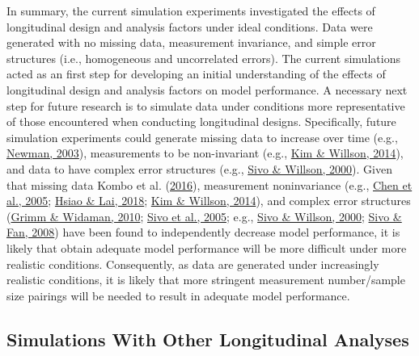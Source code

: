 \documentclass[
12pt, %
twoside,
english]{guelphthesis}
\begin{document}
In summary, the current simulation experiments investigated the effects of longitudinal design and analysis factors under ideal conditions. Data were generated with no missing data, measurement invariance, and simple error structures (i.e., homogeneous and uncorrelated errors). The current simulations acted as an first step for developing an initial understanding of the effects of longitudinal design and analysis factors on model performance. A necessary next step for future research is to simulate data under conditions more representative of those encountered when conducting longitudinal designs. Specifically, future simulation experiments could generate missing data to increase over time (e.g., \protect\hyperlink{ref-newman2003}{Newman, 2003}), measurements to be non-invariant (e.g., \protect\hyperlink{ref-kim2014a}{Kim \& Willson, 2014}), and data to have complex error structures (e.g., \protect\hyperlink{ref-sivo2000}{Sivo \& Willson, 2000}). Given that missing data Kombo et al. (\protect\hyperlink{ref-kombo2016}{2016}), measurement noninvariance (e.g., \protect\hyperlink{ref-chen2005}{Chen et al., 2005}; \protect\hyperlink{ref-hsiao2018}{Hsiao \& Lai, 2018}; \protect\hyperlink{ref-kim2014a}{Kim \& Willson, 2014}), and complex error structures (\protect\hyperlink{ref-grimm2010a}{Grimm \& Widaman, 2010}; \protect\hyperlink{ref-sivo2005}{Sivo et al., 2005}; e.g., \protect\hyperlink{ref-sivo2000}{Sivo \& Willson, 2000}; \protect\hyperlink{ref-sivo2008}{Sivo \& Fan, 2008}) have been found to independently decrease model performance, it is likely that obtain adequate model performance will be more difficult under more realistic conditions. Consequently, as data are generated under increasingly realistic conditions, it is likely that more stringent measurement number/sample size pairings will be needed to result in adequate model performance.

\hypertarget{simulations-with-other-longitudinal-analyses}{%
\subsection{Simulations With Other Longitudinal Analyses}\label{simulations-with-other-longitudinal-analyses}}
\end{document}
